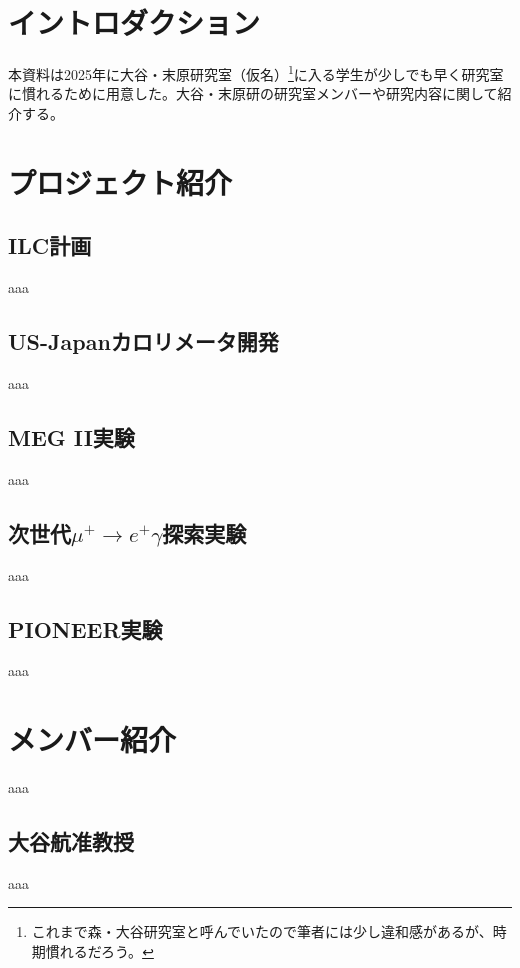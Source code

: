 \section{イントロダクション}

本資料は2025年に大谷・末原研究室（仮名）\footnote{
これまで森・大谷研究室と呼んでいたので筆者には少し違和感があるが、時期慣れるだろう。
}に入る学生が少しでも早く研究室に慣れるために用意した。大谷・末原研の研究室メンバーや研究内容に関して紹介する。


\section{プロジェクト紹介}

\subsection{ILC計画}
aaa
\subsection{US-Japanカロリメータ開発}
aaa
\subsection{MEG II実験}
aaa
\subsection{次世代$\mu^{+}\rightarrow e^{+}\gamma$探索実験}
aaa
\subsection{PIONEER実験}
aaa
\section{メンバー紹介}
aaa
\subsection{大谷航准教授}
aaa

